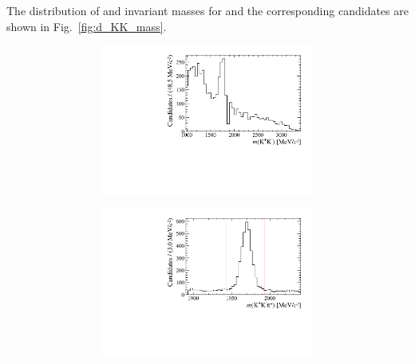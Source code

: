 The distribution of \Dsp and \Kp\Km invariant masses for \decay{\Bp}{\Dsp\Kp\Km} and the corresponding \decay{\Bp}{\Dsp\Dzb} candidates are shown in Fig.~\ref{fig:d_KK_mass}.

\begin{figure}[!h]
   \centering
   \begin{subfigure}[t]{1.0\textwidth}
      \centering
      \begin{subfigure}[t]{0.40\textwidth}
         \centering
         \includegraphics[width=1.0\textwidth]{figs/Selection/Phimass_KKPi_B2DsKK.pdf}
      \end{subfigure}
      \begin{subfigure}[t]{0.40\textwidth}
         \centering
         \includegraphics[width=1.0\textwidth]{figs/Selection/Dmass_KKPi_B2DsKK.pdf}

\end{subfigure}
\end{subfigure}
\end{figure}
